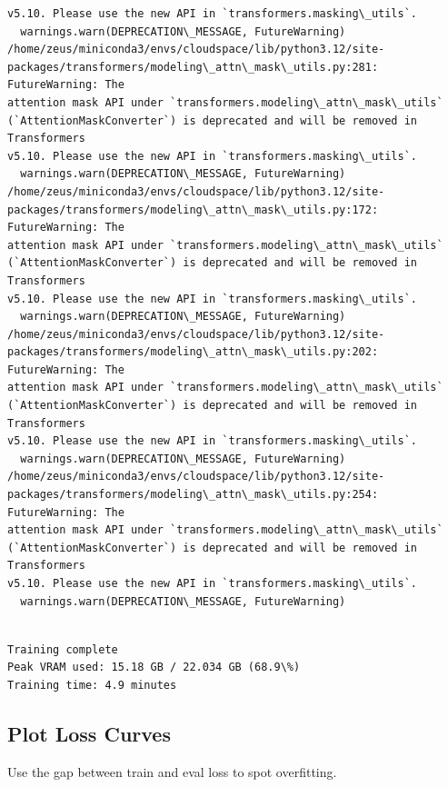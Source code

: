 \documentclass[11pt]{article}
\begin{document}
\begin{Verbatim}[commandchars=\\\{\}]
v5.10. Please use the new API in `transformers.masking\_utils`.
  warnings.warn(DEPRECATION\_MESSAGE, FutureWarning)
/home/zeus/miniconda3/envs/cloudspace/lib/python3.12/site-
packages/transformers/modeling\_attn\_mask\_utils.py:281: FutureWarning: The
attention mask API under `transformers.modeling\_attn\_mask\_utils`
(`AttentionMaskConverter`) is deprecated and will be removed in Transformers
v5.10. Please use the new API in `transformers.masking\_utils`.
  warnings.warn(DEPRECATION\_MESSAGE, FutureWarning)
/home/zeus/miniconda3/envs/cloudspace/lib/python3.12/site-
packages/transformers/modeling\_attn\_mask\_utils.py:172: FutureWarning: The
attention mask API under `transformers.modeling\_attn\_mask\_utils`
(`AttentionMaskConverter`) is deprecated and will be removed in Transformers
v5.10. Please use the new API in `transformers.masking\_utils`.
  warnings.warn(DEPRECATION\_MESSAGE, FutureWarning)
/home/zeus/miniconda3/envs/cloudspace/lib/python3.12/site-
packages/transformers/modeling\_attn\_mask\_utils.py:202: FutureWarning: The
attention mask API under `transformers.modeling\_attn\_mask\_utils`
(`AttentionMaskConverter`) is deprecated and will be removed in Transformers
v5.10. Please use the new API in `transformers.masking\_utils`.
  warnings.warn(DEPRECATION\_MESSAGE, FutureWarning)
/home/zeus/miniconda3/envs/cloudspace/lib/python3.12/site-
packages/transformers/modeling\_attn\_mask\_utils.py:254: FutureWarning: The
attention mask API under `transformers.modeling\_attn\_mask\_utils`
(`AttentionMaskConverter`) is deprecated and will be removed in Transformers
v5.10. Please use the new API in `transformers.masking\_utils`.
  warnings.warn(DEPRECATION\_MESSAGE, FutureWarning)
    \end{Verbatim}

    \begin{Verbatim}[commandchars=\\\{\}]

Training complete
Peak VRAM used: 15.18 GB / 22.034 GB (68.9\%)
Training time: 4.9 minutes
    \end{Verbatim}

    \subsection{Plot Loss Curves}\label{plot-loss-curves}

Use the gap between train and eval loss to spot overfitting.
\end{document}
